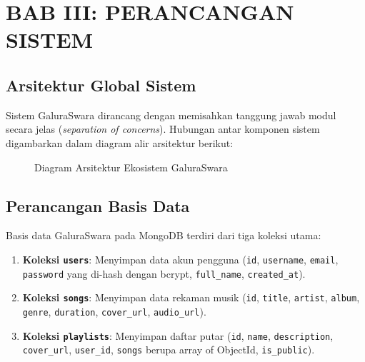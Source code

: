 \section{BAB III: PERANCANGAN SISTEM}

\subsection{Arsitektur Global Sistem}
Sistem GaluraSwara dirancang dengan memisahkan tanggung jawab modul secara jelas (\textit{separation of concerns}). Hubungan antar komponen sistem digambarkan dalam diagram alir arsitektur berikut:

\begin{figure}[htbp]
\centering
{}
\caption{Diagram Arsitektur Ekosistem GaluraSwara}
\label{fig:arsitektur}
\end{figure}

\subsection{Perancangan Basis Data}
Basis data GaluraSwara pada MongoDB terdiri dari tiga koleksi utama:
\begin{enumerate}
    \item \textbf{Koleksi \texttt{users}}: Menyimpan data akun pengguna (\texttt{id}, \texttt{username}, \texttt{email}, \texttt{password} yang di-hash dengan bcrypt, \texttt{full\_name}, \texttt{created\_at}).
    \item \textbf{Koleksi \texttt{songs}}: Menyimpan data rekaman musik (\texttt{id}, \texttt{title}, \texttt{artist}, \texttt{album}, \texttt{genre}, \texttt{duration}, \texttt{cover\_url}, \texttt{audio\_url}).
    \item \textbf{Koleksi \texttt{playlists}}: Menyimpan daftar putar (\texttt{id}, \texttt{name}, \texttt{description}, \texttt{cover\_url}, \texttt{user\_id}, \texttt{songs} berupa array of ObjectId, \texttt{is\_public}).
\end{enumerate}

